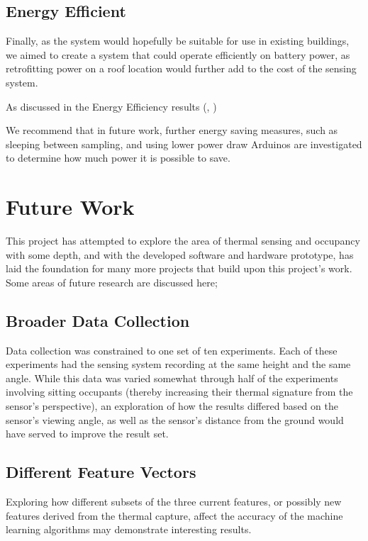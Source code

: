 \documentclass[../thesis/thesis.tex]{subfiles}
\begin{document}
\subsection{Energy Efficient}
Finally, as the system would hopefully be suitable for use in existing buildings, we aimed to create a system that could operate efficiently on battery power, as retrofitting power on a roof location would further add to the cost of the sensing system.

As discussed in the Energy Efficiency results (, ) %

We recommend that in future work, further energy saving measures, such as sleeping between sampling, and using lower power draw Arduinos are investigated to determine how much power it is possible to save.

\section{Future Work}
This project has attempted to explore the area of thermal sensing and occupancy with some depth, and with the developed software and hardware prototype, has laid the foundation for many more projects that build upon this project's work. Some areas of future research are discussed here;

\subsection{Broader Data Collection}
Data collection was constrained to one set of ten experiments. Each of these experiments had the sensing system recording at the same height and the same angle. While this data was varied somewhat through half of the experiments involving sitting occupants (thereby increasing their thermal signature from the sensor's perspective), an exploration of how the results differed based on the sensor's viewing angle, as well as the sensor's distance from the ground would have served to improve the result set.

\subsection{Different Feature Vectors}
Exploring how different subsets of the three current features, or possibly new features derived from the thermal capture, affect the accuracy of the machine learning algorithms may demonstrate interesting results. %
\end{document}
